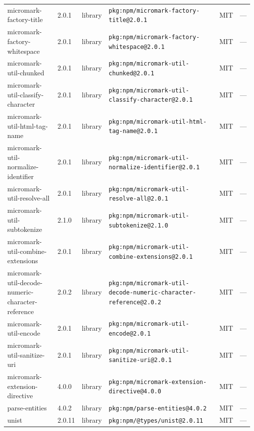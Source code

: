 \documentclass[11pt,a4paper]{article}
\begin{document}
\begin{longtable}{|p{4cm}|p{2cm}|p{1.6cm}|p{5cm}|p{1.5cm}|p{3.5cm}|}
\raggedright micromark-factory-title & 2.0.1 & library & \small\texttt{pkg:npm/micromark-factory-title@2.0.1} & MIT & \small — \\
\raggedright micromark-factory-whitespace & 2.0.1 & library & \small\texttt{pkg:npm/micromark-factory-whitespace@2.0.1} & MIT & \small — \\
\raggedright micromark-util-chunked & 2.0.1 & library & \small\texttt{pkg:npm/micromark-util-chunked@2.0.1} & MIT & \small — \\
\raggedright micromark-util-classify-character & 2.0.1 & library & \small\texttt{pkg:npm/micromark-util-classify-character@2.0.1} & MIT & \small — \\
\raggedright micromark-util-html-tag-name & 2.0.1 & library & \small\texttt{pkg:npm/micromark-util-html-tag-name@2.0.1} & MIT & \small — \\
\raggedright micromark-util-normalize-identifier & 2.0.1 & library & \small\texttt{pkg:npm/micromark-util-normalize-identifier@2.0.1} & MIT & \small — \\
\raggedright micromark-util-resolve-all & 2.0.1 & library & \small\texttt{pkg:npm/micromark-util-resolve-all@2.0.1} & MIT & \small — \\
\raggedright micromark-util-subtokenize & 2.1.0 & library & \small\texttt{pkg:npm/micromark-util-subtokenize@2.1.0} & MIT & \small — \\
\raggedright micromark-util-combine-extensions & 2.0.1 & library & \small\texttt{pkg:npm/micromark-util-combine-extensions@2.0.1} & MIT & \small — \\
\raggedright micromark-util-decode-numeric-character-reference & 2.0.2 & library & \small\texttt{pkg:npm/micromark-util-decode-numeric-character-reference@2.0.2} & MIT & \small — \\
\raggedright micromark-util-encode & 2.0.1 & library & \small\texttt{pkg:npm/micromark-util-encode@2.0.1} & MIT & \small — \\
\raggedright micromark-util-sanitize-uri & 2.0.1 & library & \small\texttt{pkg:npm/micromark-util-sanitize-uri@2.0.1} & MIT & \small — \\
\raggedright micromark-extension-directive & 4.0.0 & library & \small\texttt{pkg:npm/micromark-extension-directive@4.0.0} & MIT & \small — \\
\raggedright parse-entities & 4.0.2 & library & \small\texttt{pkg:npm/parse-entities@4.0.2} & MIT & \small — \\
\raggedright unist & 2.0.11 & library & \small\texttt{pkg:npm/@types/unist@2.0.11} & MIT & \small — \\

\end{longtable}
\end{document}
